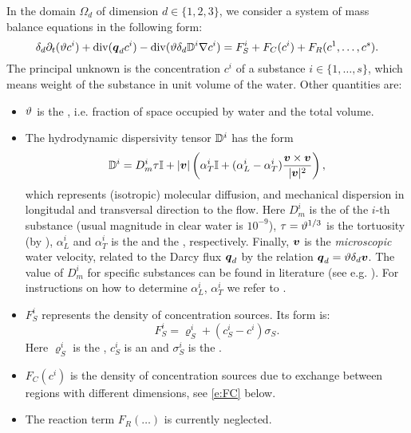 In the domain $\Omega_d$ of dimension $d\in\{1,2,3\}$, we consider a system of mass balance equations in the following form:
\begin{equation}
    \label{e:ADE}
   \delta_d\partial_t ( \th c^i) + \div ( \vc q_d c^i ) - \div (\th \delta_d \D^i \grad c^i ) = F_S^i + F_C(c^i) + F_R(c^1,\dots, c^s).
\end{equation}
The principal unknown is the concentration $c^i$  of a substance $i\in\{1,\dots, s\}$, which means weight of the substance in unit volume of the water.
Other quantities are:
\begin{itemize}

\item $\vartheta$ \units{}{}{} is the , i.e. fraction of space occupied by water and the total volume.
\item The hydrodynamic dispersivity tensor ${{\mathbb{D}}}^i$  has the form
\[
  {{\mathbb{D}}}^i =D_m^i \tau {\mathbb{I}} + \lvert\mathbf{\boldsymbol{v}}\rvert\left(\alpha_T^i {\mathbb{I}} + (\alpha_L^i - \alpha_T^i) \frac{\mathbf{\boldsymbol{v}} \times \mathbf{\boldsymbol{v}}}{\lvert\mathbf{\boldsymbol{v}}\rvert^2}\right),
\]
which represents (isotropic) molecular diffusion, and mechanical dispersion in longitudal and transversal direction to the flow.
Here $D_m^i$  is the  of the $i$-th substance (usual magnitude in clear water is $10^{-9}$), $\tau=\vartheta^{1/3}$ is the tortuosity (by \cite{millington_quirk}), $\alpha_L^i$  and $\alpha_T^i$  is the  and the , respectively.
Finally, $\mathbf{\boldsymbol{v}}$  is the \emph{microscopic} water velocity, related to the Darcy flux $\mathbf{\boldsymbol{q}}_d$ by the relation $\mathbf{\boldsymbol{q}}_d = \vartheta\delta_d\mathbf{\boldsymbol{v}}$.
The value of $D_m^i$ for specific substances can be found in literature (see e.g. \cite{cislerova_vogel}).
For instructions on how to determine $\alpha_L^i$, $\alpha_T^i$ we refer to \cite{marsily,domenico_schwartz}.

\item $F_S^i$  represents the density of concentration sources.
Its form is:
$$ F_S^i = \varrho^i_S + (c_S^i-c^i)\sigma_S. $$
Here $\varrho_S^i$  is the , $c_S^i$ is an  and $\sigma_S^i$ is the .

\item $F_C(c^i)$  is the density of concentration sources due to exchange between regions with different dimensions, see \eqref{e:FC} below.

\item The reaction term $F_R(\dots)$  is currently neglected.
\end{itemize}



